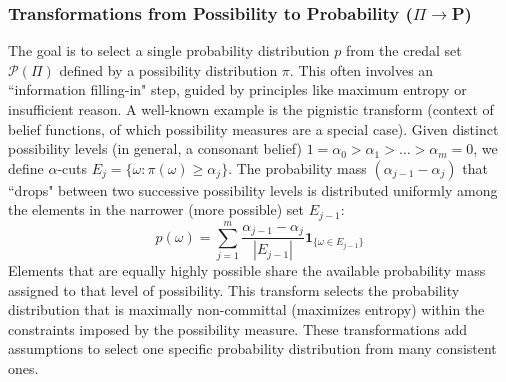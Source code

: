 {\subsubsection{Transformations from Possibility to Probability ($\Pi\to$P)}
The goal is to select a single probability distribution $p$ from the credal set $\mathcal{P}(\Pi)$ defined by a possibility distribution $\pi$. This often involves an ``information filling-in" step, guided by principles like maximum entropy or insufficient reason.
A well-known example is the pignistic transform (context of belief functions, of which possibility measures are a special case). Given distinct possibility levels (in general, a consonant belief) $1 = \alpha_0 > \alpha_1 > \dots > \alpha_m = 0$, we define $\alpha$-cuts $E_j = \{\omega : \pi(\omega) \ge \alpha_j\}$. The probability mass $(\alpha_{j-1} - \alpha_j)$ that ``drops" between two successive possibility levels is distributed uniformly among the elements in the narrower (more possible) set $E_{j-1}$:
\[ p(\omega) = \sum_{j=1}^{m} \frac{\alpha_{j-1} - \alpha_j}{|E_{j-1}|} \mathbf{1}_{\{\omega \in E_{j-1}\}} \]
Elements that are equally highly possible share the available probability mass assigned to that level of possibility. This transform selects the probability distribution that is maximally non-committal (maximizes entropy) within the constraints imposed by the possibility measure. These transformations add assumptions to select one specific probability distribution from many consistent ones.

}
